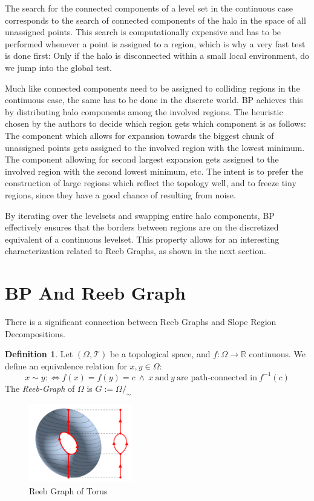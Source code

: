 \documentclass[a4paper,12pt,notitlepage,fullpage]{paper}
\theoremstyle{plain}
\theoremstyle{definition}
\newtheorem{defn}[thm]{Definition} %
\begin{document}
The search for the connected components of a level set in the continuous case corresponds to the search of connected components of the halo in the space of all unassigned points. This search is computationally expensive and has to be performed whenever a point is assigned to a region, which is why a very fast test is done first: Only if the halo is disconnected within a small local environment, do we jump into the global test.

Much like connected components need to be assigned to colliding regions in the continuous case, the same has to be done in the discrete world. BP achieves this by distributing halo components among the involved regions. The heuristic chosen by the authors to decide which region gets which component is as follows: The component which allows for expansion towards the biggest chunk of unassigned points gets assigned to the involved region with the lowest minimum. The component allowing for second largest expansion gets assigned to the involved region with the second lowest minimum, etc. The intent is to prefer the construction of large regions which reflect the topology well, and to freeze tiny regions, since they have a good chance of resulting from noise.


By iterating over the levelsets and swapping entire halo components, BP effectively ensures that the borders between regions are on the discretized equivalent of a continuous levelset. This property allows for an interesting characterization related to Reeb Graphs, as shown in the next section.

\section{BP And Reeb Graph}

There is a significant connection between Reeb Graphs and Slope Region Decompositions.

\begin{defn}
Let $(\Omega, \mathcal T)$ be a topological space, and $f: \Omega \to \mathbb R$ continuous. We define an equivalence relation for $x,y \in \Omega$: 
\begin{equation*}
x \sim y :\Leftrightarrow f(x) = f(y) = c ~\land ~ x ~\text{and}~ y ~\text{are path-connected in}~ f^{-1}(c)
\end{equation*}
The \emph{Reeb-Graph} of $\Omega$ is $G := \Omega/_\sim$
\end{defn}

\begin{figure}
\centering
\includegraphics[width=0.4\textwidth]{img/Reebgraph.png}
\caption{Reeb Graph of Torus}
\label{fig:reeb_torus}
\end{figure}
\end{document}
